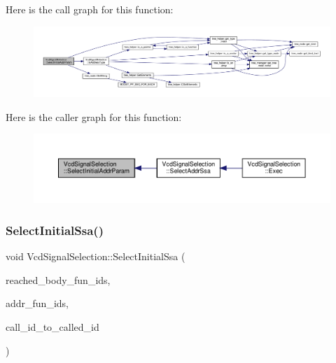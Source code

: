 Here is the call graph for this function\+:
\nopagebreak
\begin{figure}[H]
\begin{center}
\leavevmode
\includegraphics[width=350pt]{dd/de4/classVcdSignalSelection_a4ddb42f1fb382699b8b364edf7e66cec_cgraph}
\end{center}
\end{figure}
Here is the caller graph for this function\+:
\nopagebreak
\begin{figure}[H]
\begin{center}
\leavevmode
\includegraphics[width=350pt]{dd/de4/classVcdSignalSelection_a4ddb42f1fb382699b8b364edf7e66cec_icgraph}
\end{center}
\end{figure}
\mbox{\label{classVcdSignalSelection_a6cd238a016c6e74ad346437c5a8ff783}} 
\subsubsection{\texorpdfstring{Select\+Initial\+Ssa()}{SelectInitialSsa()}}
{\footnotesize\ttfamily void Vcd\+Signal\+Selection\+::\+Select\+Initial\+Ssa (\begin{DoxyParamCaption}\item[{const \hyperlink{classCustomOrderedSet}{Custom\+Ordered\+Set}$<$ unsigned int $>$ \&}]{reached\+\_\+body\+\_\+fun\+\_\+ids,  }\item[{const \hyperlink{classCustomUnorderedSet}{Custom\+Unordered\+Set}$<$ unsigned int $>$ \&}]{addr\+\_\+fun\+\_\+ids,  }\item[{const \hyperlink{custom__map_8hpp_ad1ed68f2ff093683ab1a33522b144adc}{Custom\+Unordered\+Map}$<$ unsigned int, \hyperlink{custom__set_8hpp_a1f63d303cef2790dc0a0ff7feae38f83}{Unordered\+Set\+Std\+Stable}$<$ unsigned int $>$$>$ \&}]{call\+\_\+id\+\_\+to\+\_\+called\+\_\+id }\end{DoxyParamCaption})\hspace{0.3cm}{\ttfamily [protected]}}



